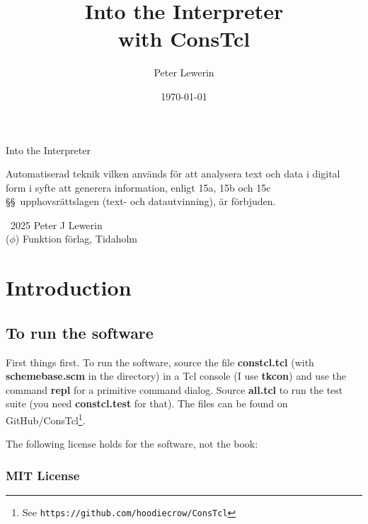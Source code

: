 \documentclass[a5paper,final]{memoir}
\title{Into the Interpreter\\with ConsTcl}
\author{Peter Lewerin}
\date{\today}
\begin{document}
\frontmatter
\pagestyle{empty}
\begin{flushright}
{Into the Interpreter}
\end{flushright}
\cleardoublepage

\begin{center}
{\Huge\sffamily\thetitle}

\vspace{0.7in}
\theauthor

\end{center}
\clearpage

\begin{center}
{\small

Automatiserad teknik vilken används för att analysera text och data i digital
form i syfte att generera information, enligt 15a, 15b och 15c \S\S\ 
upphovsrättslagen (text- och datautvinning), är förbjuden.

\textcopyright\ 2025 Peter J Lewerin\\
($\phi$) Funktion förlag, Tidaholm
}
\end{center}
\clearpage

\pagestyle{plain}

\renewcommand*{\contentsname}{Short contents}
\setcounter{tocdepth}{0}%
\tableofcontents
\clearpage
\renewcommand*{\contentsname}{Contents}
\setcounter{tocdepth}{2}%
\tableofcontents

\chapter*{Introduction}
\label{introduction}
\section*{To run the software}
\label{to-run-the-software}


First things first. To run the software, source the file \textbf{constcl.tcl}
(with \textbf{schemebase.scm} in the directory) in a Tcl console (I use
\textbf{tkcon}) and use the command \textbf{repl} for a primitive command
dialog. Source \textbf{all.tcl} to run the test suite (you need
\textbf{constcl.test} for that). The files can be found on
GitHub/ConsTcl\footnote{See \texttt{https://github.com/hoodiecrow/ConsTcl}}.

The following license holds for the software, not the book:

\subsection{MIT License}
\label{mit-license}
\end{document}
